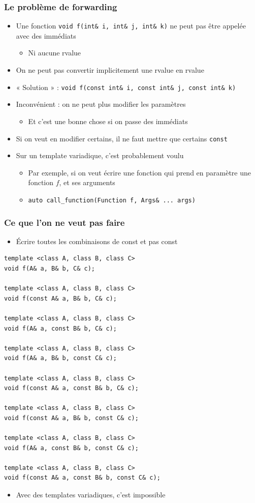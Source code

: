 \begin{frame}
\frametitle{Le problème de forwarding}
\begin{itemize}[<+->]
\item Une fonction \lstinline|void f(int& i, int& j, int& k)| ne peut pas être appelée avec des immédiats
	\begin{itemize}
	\item Ni aucune rvalue
	\end{itemize}
\item On ne peut pas convertir implicitement une rvalue en rvalue
\item « Solution » : \lstinline|void f(const int& i, const int& j, const int& k)|
\item Inconvénient : on ne peut plus modifier les paramètres
	\begin{itemize}
	\item Et c'est une bonne chose si on passe des immédiats
	\end{itemize}
\item Si on veut en modifier certains, il ne faut mettre que certains \lstinline|const|
\item Sur un template variadique, c'est probablement voulu
	\begin{itemize}
	\item Par exemple, si on veut écrire une fonction qui prend en paramètre une fonction $f$, et ses arguments
	\item \scriptsize{\lstinline|auto call_function(Function f, Args& ... args)|}
	\end{itemize}
\end{itemize}
\end{frame}

\begin{frame}[containsverbatim]
\frametitle{Ce que l'on ne veut pas faire}
\begin{itemize}
\item Écrire toutes les combinaisons de const et pas const
\end{itemize}
\begin{lstlisting}
template <class A, class B, class C>
void f(A& a, B& b, C& c);

template <class A, class B, class C>
void f(const A& a, B& b, C& c);

template <class A, class B, class C>
void f(A& a, const B& b, C& c);

template <class A, class B, class C>
void f(A& a, B& b, const C& c);

template <class A, class B, class C>
void f(const A& a, const B& b, C& c);

template <class A, class B, class C>
void f(const A& a, B& b, const C& c);

template <class A, class B, class C>
void f(A& a, const B& b, const C& c);

template <class A, class B, class C>
void f(const A& a, const B& b, const C& c);
\end{lstlisting}
\begin{itemize}
\item Avec des templates variadiques, c'est impossible
\end{itemize}
\end{frame}

